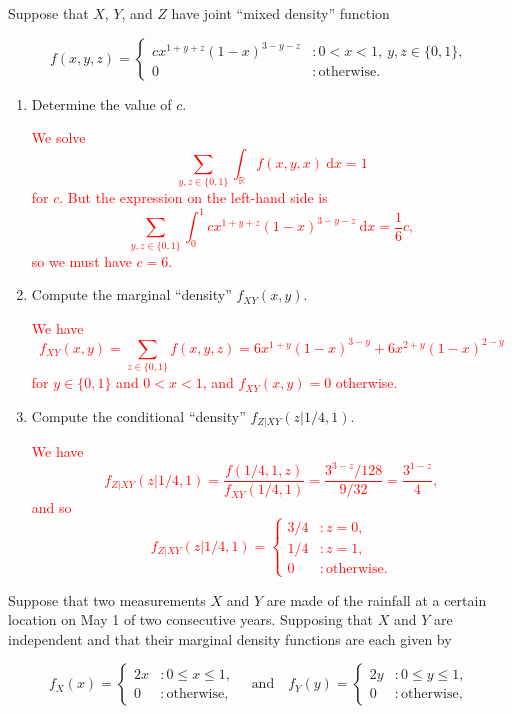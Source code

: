 \documentclass[12pt,reqno]{amsart}
\begin{document}
\prob Suppose that $X$, $Y$, and $Z$ have joint ``mixed density'' function

	\[
	f(x,y,z) = \begin{cases}
	c x^{1+y+z} ( 1-x)^{3-y-z} & : 0 < x< 1, \ y,z\in \{0,1\}, \\
	0 & : \text{otherwise}.
	\end{cases}
	\]
	
\medskip
\begin{enumerate}
\item Determine the value of $c$.

\bigskip
\textcolor{red}{We solve
	\[
	\sum_{y,z\in \{0,1\}} \int_\mathbb{R} f(x,y,x) \ \text{d}x = 1
	\]
for $c$. But the expression on the left-hand side is
	\[
	\sum_{y,z\in \{0,1\}} \int_0^1 c x^{1+y+z}( 1-x)^{3-y-z} \ \text{d}x = \frac{1}{6}c,
	\]
so we must have $c = 6$.}
\bigskip

\item Compute the marginal ``density'' $f_{XY}(x,y)$.

\bigskip
\textcolor{red}{We have
	\[
	f_{XY}(x,y) = \sum_{z\in\{0,1\}} f(x,y,z) = 6x^{1+y}(1-x)^{3-y} + 6x^{2+y}(1-x)^{2-y}
	\]
for $y\in \{0,1\}$ and $0 < x < 1$, and $f_{XY}(x,y)=0$ otherwise.}
\bigskip


\item Compute the conditional ``density'' $f_{Z|XY}(z|1/4, 1)$.

\bigskip
\textcolor{red}{We have
	\[
	f_{Z|XY}(z|1/4,1) = \frac{f(1/4,1,z)}{f_{XY}(1/4,1)} = \frac{3^{3-z}/128}{9/32} = \frac{3^{1-z}}{4},
	\]
and so
	\[
	f_{Z|XY}(z|1/4,1) = \begin{cases}
	3/4 & : z=0, \\
	1/4 & : z=1, \\
	0 & : \text{otherwise}.
	\end{cases}
	\]}
\bigskip
\end{enumerate}














\prob Suppose that two measurements $X$ and $Y$ are made of the rainfall at a certain location on May 1 of two consecutive years. Supposing that $X$ and $Y$ are independent and that their marginal density functions are each given by

	\[
	f_X(x) = \begin{cases}
	2x & : 0 \leq x \leq 1, \\
	0 & : \text{otherwise},
	\end{cases} \quad \text{and} \quad
	f_Y(y) = \begin{cases}
	2y & : 0 \leq y \leq 1, \\
	0 & : \text{otherwise},
	\end{cases}
	\]
\end{document}
